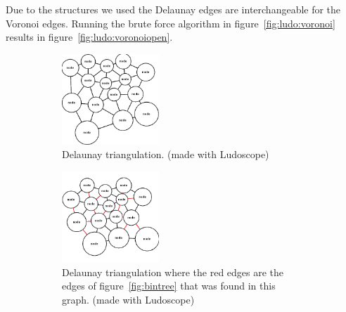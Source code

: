 \documentclass[11pt,a4paper,twocolumn]{article}
\begin{document}
Due to the structures we used the Delaunay edges are interchangeable for the Voronoi edges. Running the brute force algorithm in figure~\ref{fig:ludo:voronoi} results in figure~\ref{fig:ludo:voronoiopen}. 
\begin{figure}[h]
	\begin{subfigure}[b]{0.5\textwidth}
		\centering
		\includegraphics[width=0.4\textwidth]{images/ludodelaunay.png}
		\caption{Delaunay triangulation. (made with Ludoscope)}\label{fig:ludo:delaunay}
	\end{subfigure}
	
	\begin{subfigure}[b]{0.5\textwidth}
		\centering
		\includegraphics[width=0.4\textwidth]{images/ludodelaunaypaths.png}
		\caption{Delaunay triangulation where the red edges are the edges of figure~\ref{fig:bintree} that was found in this graph. (made with Ludoscope)}\label{fig:ludo:delaunaypaths}
	\end{subfigure}
	\caption{ }\label{fig:ludo:delaunays}
\end{figure}
\end{document}
